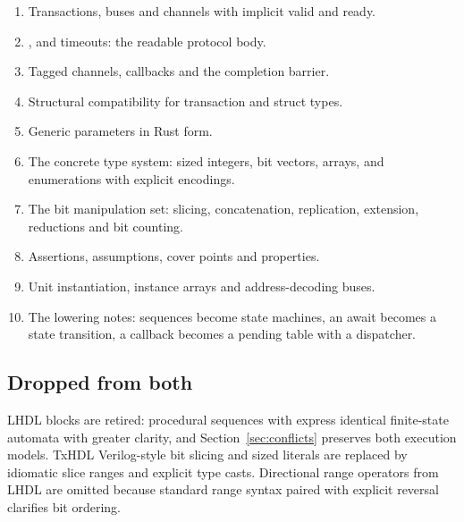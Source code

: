 \begin{enumerate}
  \item Transactions, buses and channels with implicit valid and ready.
  \item {},  and timeouts: the readable protocol
        body.
  \item Tagged channels, callbacks and the completion barrier.
  \item Structural compatibility for transaction and struct types.
  \item Generic parameters in Rust form.
  \item The concrete type system: sized integers, bit vectors, arrays, and
        enumerations with explicit encodings.
  \item The bit manipulation set: slicing, concatenation, replication,
        extension, reductions and bit counting.
  \item Assertions, assumptions, cover points and properties.
  \item Unit instantiation, instance arrays and address-decoding buses.
  \item The lowering notes: sequences become state machines, an await
        becomes a state transition, a callback becomes a pending table with
        a dispatcher.
\end{enumerate}

\subsection{Dropped from both}

LHDL  blocks are retired: procedural sequences with 
express identical finite-state automata with greater clarity, and
Section~\ref{sec:conflicts} preserves both execution models. TxHDL Verilog-style
bit slicing and sized literals are replaced by idiomatic slice ranges and
explicit type casts. Directional range operators from LHDL are omitted because
standard range syntax paired with explicit reversal clarifies bit ordering.
